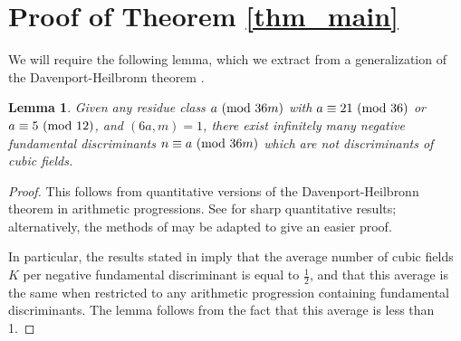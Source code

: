 \documentclass[12pt]{amsart}
\newtheorem{lemma}[theorem]{Lemma}
\theoremstyle{remark}
\numberwithin{theorem}{section} \numberwithin{equation}{section}
\newcommand{\textmod}{{\text {\rm mod}}}
\begin{document}
\section{Proof of Theorem \ref{thm_main}}
We will require the following lemma, which we extract from a generalization of the Davenport-Heilbronn theorem \cite{DH}.
\begin{lemma}\label{lem_dh}
Given any residue class $a \ (\textmod \ 36m)$ with $a \equiv 21 \ (\textmod \ 36)$ or $a \equiv 5 \ (\textmod \ 12)$, and $(6a, m) = 1$, 
there exist infinitely many negative fundamental discriminants $n \equiv a \ (\textmod \ 36m)$ which are not discriminants of cubic fields.
\end{lemma}
\begin{proof}
This follows from quantitative versions of the Davenport-Heilbronn theorem in arithmetic progressions. See \cite{TT}
for sharp quantitative results; alternatively, the methods of \cite{HN} may be adapted to give an easier proof.

In particular, the results stated in \cite{TT} imply that the average number of cubic fields $K$ per negative fundamental discriminant
is equal to $\frac{1}{2}$, and that this average is the same when restricted to any arithmetic progression containing fundamental
discriminants. The lemma follows from the fact that this average is less than 1.
\end{proof}
\end{document}
